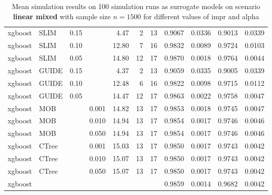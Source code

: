 \begin{table}[!htb]
\begin{tabular}[t]{l|l|r|r|r|r|r|r|r|r|r}
xgboost & SLIM & 0.15 & & 4.47 & 2 & 13 & 0.9067 & 0.0336 & 0.9013 & 0.0339\\
xgboost & SLIM & 0.10 & & 12.80 & 7 & 16 & 0.9832 & 0.0089 & 0.9724 & 0.0103\\
xgboost & SLIM & 0.05 & & 14.80 & 12 & 17 & 0.9870 & 0.0018 & 0.9764 & 0.0044\\
xgboost & GUIDE & 0.15 & & 4.37 & 2 & 13 & 0.9059 & 0.0335 & 0.9005 & 0.0339\\
xgboost & GUIDE & 0.10 & & 12.48 & 6 & 16 & 0.9822 & 0.0098 & 0.9715 & 0.0112\\
xgboost & GUIDE & 0.05 & & 14.47 & 12 & 17 & 0.9863 & 0.0022 & 0.9758 & 0.0047\\
xgboost & MOB & & 0.001 & 14.82 & 13 & 17 & 0.9853 & 0.0018 & 0.9745 & 0.0047\\
xgboost & MOB & & 0.010 & 14.94 & 13 & 17 & 0.9854 & 0.0017 & 0.9746 & 0.0046\\
xgboost & MOB & & 0.050 & 14.94 & 13 & 17 & 0.9854 & 0.0017 & 0.9746 & 0.0046\\
xgboost & CTree & & 0.001 & 15.03 & 13 & 17 & 0.9850 & 0.0017 & 0.9743 & 0.0042\\
xgboost & CTree & & 0.010 & 15.07 & 13 & 17 & 0.9850 & 0.0017 & 0.9743 & 0.0042\\
xgboost & CTree & & 0.050 & 15.07 & 13 & 17 & 0.9850 & 0.0017 & 0.9743 & 0.0042\\
\hline
xgboost & & & & & & & 0.9859 & 0.0014 & 0.9682 & 0.0042\\
\hline
\end{tabular}
\caption{Mean simulation results on 100 simulation runs as surrogate models on scenario \textbf{linear mixed} with sample size $n=1500$ for different values of impr and alpha}
\label{tab:app_linear_mixed_1000}

\end{table}





